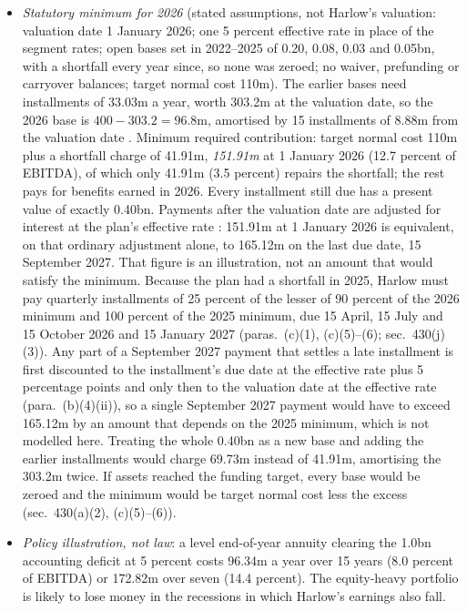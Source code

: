 \begin{qfmethod}
\begin{itemize}
\item \emph{Statutory minimum for 2026} (stated assumptions, not Harlow's valuation: valuation date 1 January 2026; one 5 percent effective rate in place of the segment rates; open bases set in 2022--2025 of 0.20, 0.08, 0.03 and 0.05bn, with a shortfall every year since, so none was zeroed; no waiver, prefunding or carryover balances; target normal cost 110m). The earlier bases need installments of 33.03m a year, worth 303.2m at the valuation date, so the 2026 base is $400-303.2=96.8$m, amortised by 15 installments of 8.88m from the valuation date \citep[sec.~430(a), (c)(1)--(3), (c)(8), (g)(2)]{us-internal-revenue-code-26}. Minimum required contribution: target normal cost 110m plus a shortfall charge of 41.91m, \emph{151.91m} at 1 January 2026 (12.7 percent of EBITDA), of which only 41.91m (3.5 percent) repairs the shortfall; the rest pays for benefits earned in 2026. Every installment still due has a present value of exactly 0.40bn. Payments after the valuation date are adjusted for interest at the plan's effective rate \citep[para.~(b)(4)(i)]{cfr-26-1-430j-1}: 151.91m at 1 January 2026 is equivalent, on that ordinary adjustment alone, to 165.12m on the last due date, 15 September 2027. That figure is an illustration, not an amount that would satisfy the minimum. Because the plan had a shortfall in 2025, Harlow must pay quarterly installments of 25 percent of the lesser of 90 percent of the 2026 minimum and 100 percent of the 2025 minimum, due 15 April, 15 July and 15 October 2026 and 15 January 2027 (paras.~(c)(1), (c)(5)--(6); sec.~430(j)(3)). Any part of a September 2027 payment that settles a late installment is first discounted to the installment's due date at the effective rate plus 5 percentage points and only then to the valuation date at the effective rate (para.~(b)(4)(ii)), so a single September 2027 payment would have to exceed 165.12m by an amount that depends on the 2025 minimum, which is not modelled here. Treating the whole 0.40bn as a new base and adding the earlier installments would charge 69.73m instead of 41.91m, amortising the 303.2m twice. If assets reached the funding target, every base would be zeroed and the minimum would be target normal cost less the excess (sec.~430(a)(2), (c)(5)--(6)).
\item \emph{Policy illustration, not law}: a level end-of-year annuity clearing the 1.0bn accounting deficit at 5 percent costs 96.34m a year over 15 years (8.0 percent of EBITDA) or 172.82m over seven (14.4 percent). The equity-heavy portfolio is likely to lose money in the recessions in which Harlow's earnings also fall.

\end{itemize}
\end{qfmethod}
